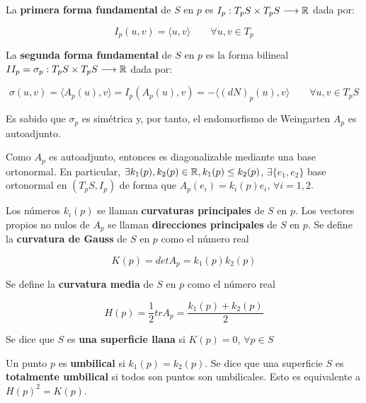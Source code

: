 \begin{definition}
La \textbf{primera forma fundamental} de $S$ en $p$ es $I_p: T_pS \times T_pS \longrightarrow \mathbb{R}$ dada por: 

\begin{equation*}
    I_p(u,v) =  \langle u,v \rangle \qquad \forall u,v \in T_p
\end{equation*}

La \textbf{segunda forma fundamental} de $S$ en $p$ es la forma bilineal $II_p = \sigma_p: T_pS \times T_pS \longrightarrow \mathbb{R}$ dada por: 

\begin{equation*}
    \sigma(u,v) = \langle A_p(u),v \rangle  = I_p(A_p(u),v) = - \langle (dN)_p(u), v \rangle \qquad \forall u,v \in T_pS
\end{equation*}

\end{definition}

Es sabido que $\sigma_p$ es simétrica y, por tanto, el endomorfismo de Weingarten $A_p$ es autoadjunto.

Como $A_p$ es autoadjunto, entonces es diagonalizable mediante una base ortonormal. En particular, $\exists k_1(p), k_2(p) \in \mathbb{R}, k_1(p) \leq k_2(p)$, $\exists \{e_1,e_2\}$ base ortonormal en $(T_pS, I_p)$ de forma que $A_p(e_i) = k_i(p)e_i$, $\forall i = 1,2$.

Los números $k_i(p)$ se llaman \textbf{curvaturas principales} de $S$ en $p$.
Los vectores propios no nulos de $A_p$ se llaman \textbf{direcciones principales} de $S$ en $p$.
Se define la \textbf{curvatura de Gauss} de $S$ en $p$ como el número real 

\begin{equation*}
    K(p)=det A_p=k_1(p)k_2(p)
\end{equation*}

Se define la \textbf{curvatura media} de $S$ en $p$ como el número real 

\begin{equation*}
    H(p)=\frac{1}{2}tr A_p=\frac{k_1(p)+k_2(p)}{2}
\end{equation*}

Se dice que $S$ es \textbf{una superficie llana} si $K(p)=0$, $\forall p \in S$

\begin{definition}
Un punto $p$ es \textbf{umbilical} si $k_1(p)=k_2(p)$.
Se dice que una superficie $S$ es \textbf{totalmente umbilical} si todos son puntos son umbilicales. Esto es equivalente a $H(p)^2=K(p)$.
\end{definition}


